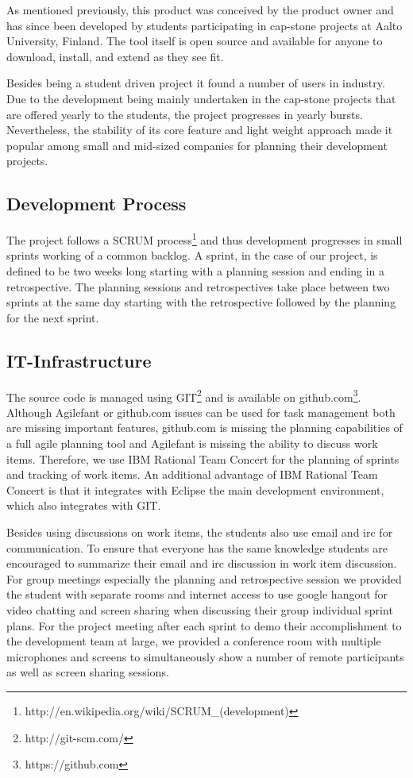 As mentioned previously, this product was conceived by the product owner and has since been developed by students participating in cap-stone projects at Aalto University, Finland.
The tool itself is open source and available for anyone to download, install, and extend as they see fit.

Besides being a student driven project it found a number of users in industry.
Due to the development being mainly undertaken in the cap-stone projects that are offered yearly to the students, the project progresses in yearly bursts.
Nevertheless, the stability of its core feature and light weight approach made it popular among small and mid-sized companies for planning their development projects.

\subsection{Development Process}
The project follows a SCRUM process\footnote{http://en.wikipedia.org/wiki/SCRUM\_(development)} and thus development progresses in small sprints working of a common backlog.
A sprint, in the case of our project, is defined to be two weeks long starting with a planning session and ending in a retrospective.
The planning sessions and retrospectives take place between two sprints at the same day starting with the retrospective followed by the planning for the next sprint.

\subsection{IT-Infrastructure}
The source code is managed using GIT\footnote{http://git-scm.com/} and is available on github.com\footnote{https://github.com}.
Although Agilefant or github.com issues can be used for task management both are missing important features, github.com is missing the planning capabilities of a full agile planning tool and Agilefant is missing the ability to discuss work items.
Therefore, we use IBM Rational Team Concert for the planning of sprints and tracking of work items.
An additional advantage of IBM Rational Team Concert is that  it integrates with Eclipse the main development environment, which also integrates with GIT. 

Besides using discussions on work items, the students also use email and irc for communication.
To ensure that everyone has the same knowledge students are encouraged to summarize their email and irc discussion in work item discussion.
For group meetings especially the planning and retrospective session we provided the student with separate rooms and internet access to use google hangout for video chatting and screen sharing when discussing their group individual sprint plans.
For the project meeting after each sprint to demo their accomplishment to the development team at large, we provided a conference room with multiple microphones and screens to simultaneously show a number of remote participants as well as screen sharing sessions. 

